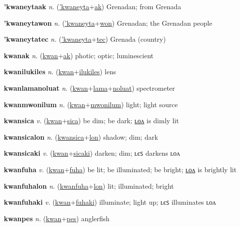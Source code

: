 \textbf{\hypertarget{'kwaneytaak}{'kwaneytaak}} \textit{n.} (\hyperlink{'kwaneyta}{'kwaneyta}+\allowbreak \hyperlink{ak}{ak})
Grenadan; from Grenada

\textbf{\hypertarget{'kwaneytawon}{'kwaneytawon}} \textit{n.} (\hyperlink{'kwaneyta}{'kwaneyta}+\allowbreak \hyperlink{won}{won})
Grenadan; the Grenadan people

\textbf{\hypertarget{'kwaneytatec}{'kwaneytatec}} \textit{n.} (\hyperlink{'kwaneyta}{'kwaneyta}+\allowbreak \hyperlink{tec}{tec})
Grenada (country)

\textbf{\hypertarget{kwanak}{kwanak}} \textit{n.} (\hyperlink{kwan}{kwan}+\allowbreak \hyperlink{ak}{ak})
photic; optic; luminescient

\textbf{\hypertarget{kwanilukiles}{kwanilukiles}} \textit{n.} (\hyperlink{kwan}{kwan}+\allowbreak \hyperlink{ilukiles}{ilukiles})
lens

\textbf{\hypertarget{kwanlamanoluat}{kwanlamanoluat}} \textit{n.} (\hyperlink{kwan}{kwan}+\allowbreak \hyperlink{lama}{lama}+\allowbreak \hyperlink{noluat}{noluat})
spectrometer

\textbf{\hypertarget{kwanmwonilum}{kwanmwonilum}} \textit{n.} (\hyperlink{kwan}{kwan}+\allowbreak \hyperlink{mwonilum}{mwonilum})
light; light source

\textbf{\hypertarget{kwansica}{kwansica}} \textit{v.} (\hyperlink{kwan}{kwan}+\allowbreak \hyperlink{sica}{sica})
be dim; be dark; \hyperlink{kwansicalon}{ʟᴏᴧ} is dimly lit

\textbf{\hypertarget{kwansicalon}{kwansicalon}} \textit{n.} (\hyperlink{kwansica}{kwansica}+\allowbreak \hyperlink{lon}{lon})
shadow; dim; dark

\textbf{\hypertarget{kwansicaki}{kwansicaki}} \textit{v.} (\hyperlink{kwan}{kwan}+\allowbreak \hyperlink{sicaki}{sicaki})
darken; dim; ʟєꜱ darkens ʟᴏᴧ

\textbf{\hypertarget{kwanfuha}{kwanfuha}} \textit{v.} (\hyperlink{kwan}{kwan}+\allowbreak \hyperlink{fuha}{fuha})
be lit; be illuminated; be bright; \hyperlink{kwanfuhalon}{ʟᴏᴧ} is brightly lit

\textbf{\hypertarget{kwanfuhalon}{kwanfuhalon}} \textit{n.} (\hyperlink{kwanfuha}{kwanfuha}+\allowbreak \hyperlink{lon}{lon})
lit; illuminated; bright

\textbf{\hypertarget{kwanfuhaki}{kwanfuhaki}} \textit{v.} (\hyperlink{kwan}{kwan}+\allowbreak \hyperlink{fuhaki}{fuhaki})
illuminate; light up; ʟєꜱ illuminates ʟᴏᴧ

\textbf{\hypertarget{kwanpes}{kwanpes}} \textit{n.} (\hyperlink{kwan}{kwan}+\allowbreak \hyperlink{pes}{pes})
anglerfish

